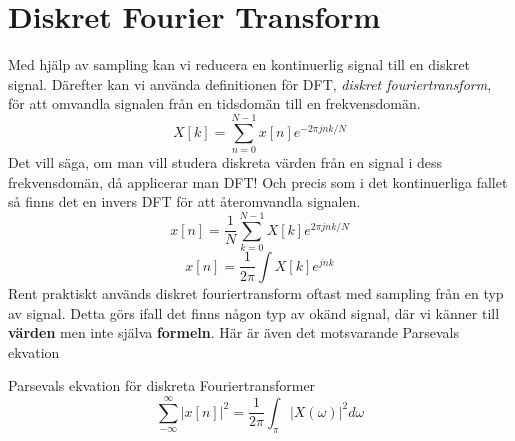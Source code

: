 \documentclass{article}
\begin{document}
\section{Diskret Fourier Transform}
Med hjälp av sampling kan vi reducera en kontinuerlig signal till en diskret signal. Därefter kan vi använda definitionen för DFT, \emph{diskret fouriertransform}, för att omvandla signalen från en tidsdomän till en frekvensdomän.
$$X[k] = \sum_{n=0}^{N-1} x[n] e^{-2 \pi j n k/N}$$
Det vill säga, om man vill studera diskreta värden från en signal i dess frekvensdomän, då applicerar man DFT! Och precis som i det kontinuerliga fallet så finns det en invers DFT för att återomvandla signalen.
$$x[n] = \frac{1}{N} \sum_{k=0}^{N-1} X[k] e^{2 \pi j n k/N} $$
$$x[n] = \frac{1}{2\pi} \int X[k] e^{j n k}$$
Rent praktiskt används diskret fouriertransform oftast med sampling från en typ av signal. Detta görs ifall det finns någon typ av okänd signal, där vi känner till \textbf{värden} men inte själva \textbf{formeln}. %
Här är även det motsvarande Parsevals ekvation

Parsevals ekvation för diskreta Fouriertransformer
$$\sum_{-\infty}^{\infty} |x[n]|^2 = \frac{1}{2\pi} \int_{\pi}|X(\omega)|^2 d\omega $$

\end{document}
